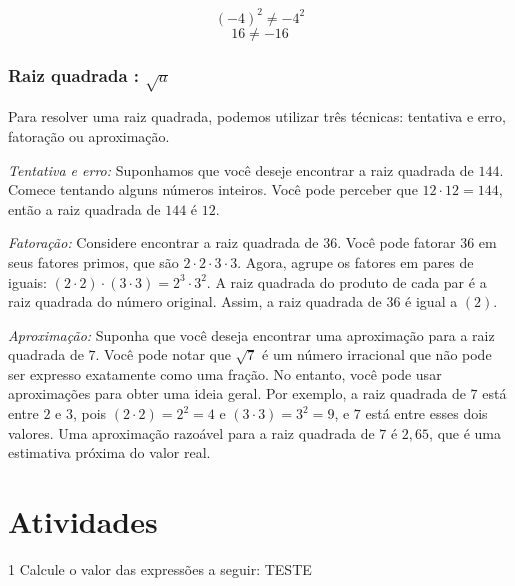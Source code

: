 {$$\left( - 4 \right)^{2} \neq - 4^{2}$$
$$16 \neq - 16$$

\subsubsection*{Raiz quadrada : $\sqrt{a}$}

Para resolver uma raiz quadrada, podemos utilizar três técnicas:
tentativa e erro, fatoração ou aproximação.


\medskip\noindent \textit{Tentativa e erro:} Suponhamos que você deseje encontrar a raiz quadrada de
$144$. Comece tentando alguns números inteiros. Você pode perceber que
$12 \cdot 12 = 144$, então a raiz quadrada de $144$ é $12$.

\medskip\noindent \textit{Fatoração:} Considere encontrar a raiz quadrada de $36$. Você pode fatorar $36$
em seus fatores primos, que são $2 \cdot 2 \cdot 3 \cdot 3$. Agora, agrupe os
fatores em pares de iguais: $(2 \cdot 2) \cdot (3 \cdot 3) = 2^3 \cdot 3^2$. A raiz quadrada
do produto de cada par é a raiz quadrada do número original. Assim, a raiz
quadrada de $36$ é igual a $(2)$.

\medskip\noindent \textit{Aproximação:} Suponha que você deseja encontrar uma aproximação para a raiz
quadrada de $7$. Você pode notar que $\sqrt{7}$ é um número irracional que
não pode ser expresso exatamente como uma fração. No entanto, você pode usar
aproximações para obter uma ideia geral. Por exemplo,  a
raiz quadrada de $7$ está entre $2$ e $3$, pois $(2 \cdot 2) = 2^2 = 4$ e $(3 \cdot 3) = 3^2 = 9$, e $7$ está
entre esses dois valores. Uma aproximação razoável para a raiz quadrada de $7$
é $2,65$, que é uma estimativa próxima do valor real.}



\section*{Atividades}

\num{1} Calcule o valor das expressões a seguir: TESTE

